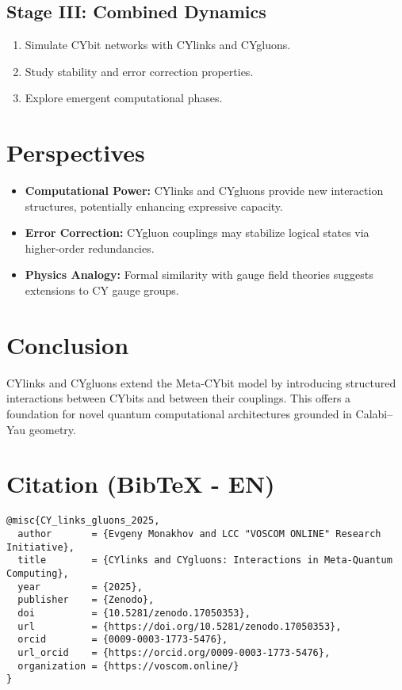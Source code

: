 \documentclass[12pt,a4paper]{article}
\begin{document}
\subsection{Stage III: Combined Dynamics}
\begin{enumerate}
\item Simulate CYbit networks with CYlinks and CYgluons.  
\item Study stability and error correction properties.  
\item Explore emergent computational phases.  
\end{enumerate}

\section{Perspectives}
\begin{itemize}
\item \textbf{Computational Power:} CYlinks and CYgluons provide new interaction structures, potentially enhancing expressive capacity.  
\item \textbf{Error Correction:} CYgluon couplings may stabilize logical states via higher-order redundancies.  
\item \textbf{Physics Analogy:} Formal similarity with gauge field theories suggests extensions to CY gauge groups.  
\end{itemize}

\section{Conclusion}
CYlinks and CYgluons extend the Meta-CYbit model by introducing structured interactions 
between CYbits and between their couplings.  
This offers a foundation for novel quantum computational architectures 
grounded in Calabi--Yau geometry.  

\section*{Citation (BibTeX - EN)}
\begin{verbatim}
@misc{CY_links_gluons_2025,
  author       = {Evgeny Monakhov and LCC "VOSCOM ONLINE" Research Initiative},
  title        = {CYlinks and CYgluons: Interactions in Meta-Quantum Computing},
  year         = {2025},
  publisher    = {Zenodo},
  doi          = {10.5281/zenodo.17050353},
  url          = {https://doi.org/10.5281/zenodo.17050353},
  orcid        = {0009-0003-1773-5476},
  url_orcid    = {https://orcid.org/0009-0003-1773-5476},
  organization = {https://voscom.online/}
}
\end{verbatim}
\end{document}
